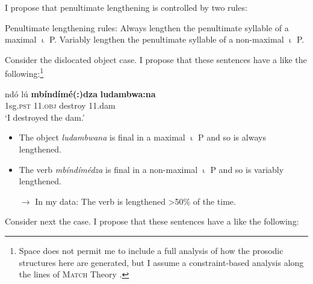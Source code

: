 \documentclass[output=paper 
,modfonts
,nonflat]{langsci/langscibook}
\begin{document}
\noindent
I propose that penultimate lengthening is controlled by two rules:


\ea \label{ex:kusmer:lengthening_rules} {Penultimate lengthening rules:}
\ea Always lengthen the penultimate syllable of a maximal $\upiota$ P.
\ex Variably lengthen the penultimate syllable of a non-maximal $\upiota$ P.
\z
\z

Consider the dislocated object case. I propose that these sentences have a
 like the following:\footnote{Space does not permit me to
include a full analysis of how the prosodic structures here are generated, but I
assume a constraint-based analysis along the lines of \textsc{Match} Theory
\citep{Selkirk11}.}



\ea \label{ex:kusmer:disloc_pros} 
\gll {\lipm} {\lipn} ndó lú \textbf{mbíndímé(:)dza} {\ripn} \textbf{ludambwa:na} {\ripm}\\
{} {} 1sg.\textsc{pst}  \textsc{11.obj} destroy {} 11.dam {}\\
	\glt  `I destroyed the dam.'
\z

\begin{itemize}
	\item The object \textit{ludambwana} is final in a maximal $\upiota$ P and so is always
		lengthened.
	\item The verb \textit{mbíndímédza} is final in a non-maximal $\upiota$ P and so is
		variably lengthened.
	\item[$\rightarrow$] In my data: The verb is lengthened >50\% of the time.
\end{itemize}

\noindent
Consider next the  case. I propose that these sentences
have a  like the following:

\end{document}
